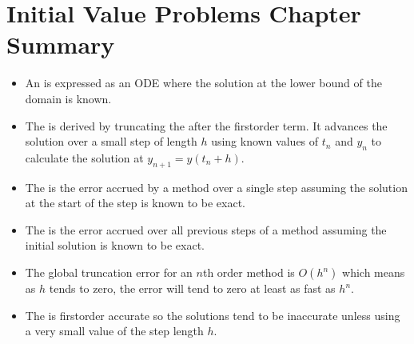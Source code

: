\documentclass[letterpaper,10pt,english]{jupyterBook}
\begin{document}
\sphinxstepscope


\section{Initial Value Problems Chapter Summary}
\label{\detokenize{1_IVPs/1.6_IVP_Summary:initial-value-problems-chapter-summary}}\label{\detokenize{1_IVPs/1.6_IVP_Summary::doc}}\begin{itemize}
\item {} 
\sphinxAtStartPar
An {\hyperref[\detokenize{1_IVPs/1.0_IVPs:ivp-definition}]{}} is expressed as an ODE where the solution at the lower bound of the domain is known.

\item {} 
\sphinxAtStartPar
The {\hyperref[\detokenize{1_IVPs/1.2_Euler_Method:euler-method-definition}]{}} is derived by truncating the {\hyperref[\detokenize{1_IVPs/1.1_Taylor_Series:taylor-series-definition}]{}} after the first\sphinxhyphen{}order term. It advances the solution over a small step of length \(h\) using known values of \(t_n\) and \(y_n\) to calculate the solution at \(y_{n+1} =y(t_n +h)\).

\item {} 
\sphinxAtStartPar
The {\hyperref[\detokenize{1_IVPs/1.3_Error_Analysis:lte-definition}]{}} is the error accrued by a method over a single step assuming the solution at the start of the step is known to be exact.

\item {} 
\sphinxAtStartPar
The {\hyperref[\detokenize{1_IVPs/1.3_Error_Analysis:gte-definition}]{}} is the error accrued over all previous steps of a method assuming the initial solution is known to be exact.

\item {} 
\sphinxAtStartPar
The global truncation error for an \(n\)th order method is \(O(h^{n})\) which means as \(h\) tends to zero, the error will tend to zero at least as fast as \(h^n\).

\item {} 
\sphinxAtStartPar
The {\hyperref[\detokenize{1_IVPs/1.2_Euler_Method:euler-method-definition}]{}} is first\sphinxhyphen{}order accurate so the solutions tend to be inaccurate unless using a very small value of the step length \(h\).


\end{itemize}
\end{document}
